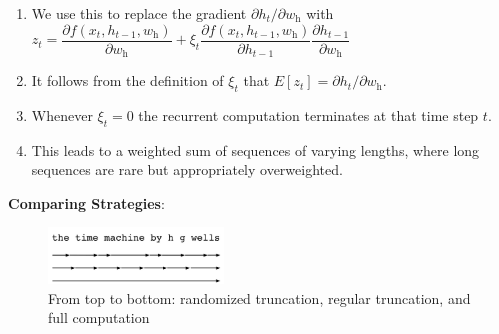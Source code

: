 \begin{enumerate}[itemsep=0.2cm]
\begin{enumerate}
        \item We use this to replace the gradient $\partial h_t/\partial w_\textrm{h}$ with $z_t= \dfrac{\partial f(x_{t},h_{t-1},w_\textrm{h})}{\partial w_\textrm{h}} +\xi_t \dfrac{\partial f(x_{t},h_{t-1},w_\textrm{h})}{\partial h_{t-1}} \dfrac{\partial h_{t-1}}{\partial w_\textrm{h}}$

        \item It follows from the definition of $\xi_t$ that $E[z_t] = \partial h_t/\partial w_\textrm{h}$. 
        
        \item Whenever $\xi_t = 0$ the recurrent computation terminates at that time step $t$. 
        
        \item This leads to a weighted sum of sequences of varying lengths, where long sequences are rare but appropriately overweighted. 
    \end{enumerate}
\end{enumerate}

\vspace{0.5cm}
\noindent
\textbf{Comparing Strategies}:

\begin{figure}[H]
    \centering
    \includegraphics[width=\linewidth, height=1.5cm, keepaspectratio]{Pictures/Recurrent-Neural-Networks/rnn-backprop-strategies.jpg}
    \caption*{From top to bottom: randomized truncation, regular truncation, and full computation}
\end{figure}

